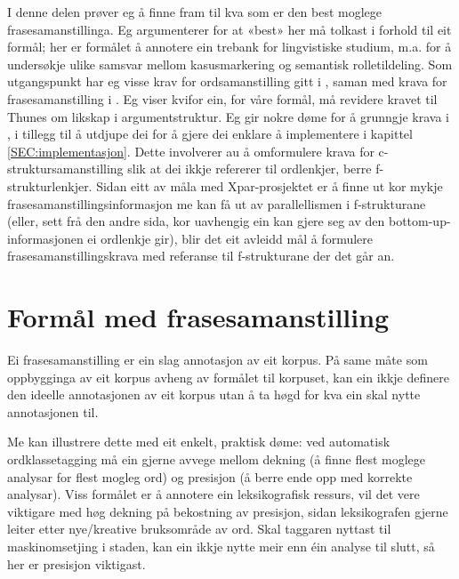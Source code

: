 \documentclass[12pt,a4paper,oneside,draft]{report}
\begin{document}
I denne delen prøver eg å finne fram til kva som er den best moglege
 frasesamanstillinga. Eg argumenterer for at «best» her må tolkast i
 forhold til eit formål; her er formålet å annotere ein trebank for
 lingvistiske studium, m.a. for å undersøkje ulike samsvar mellom
 kasusmarkering og semantisk rolletildeling.  Som utgangspunkt har eg
 visse krav for ordsamanstilling gitt i \citet{thunes2003eal}, saman
 med krava for frasesamanstilling i \citet{dyvik2009lmp}. Eg viser
 kvifor ein, for våre formål, må revidere kravet til Thunes om likskap
 i argumentstruktur. Eg gir nokre døme for å grunngje krava i
 \citet{dyvik2009lmp}, i tillegg til å utdjupe dei for å gjere dei
 enklare å implementere i kapittel \ref{SEC:implementasjon}. Dette
 involverer au å omformulere krava for c\hyp{}struktursamanstilling slik at
 dei ikkje refererer til ordlenkjer, berre f\hyp{}strukturlenkjer. Sidan
 eitt av måla med Xpar-prosjektet er å finne ut kor mykje
 frasesamanstillingsinformasjon me kan få ut av parallellismen i
 f\hyp{}strukturane (eller, sett frå den andre sida, kor uavhengig ein kan
 gjere seg av den bottom-up-informasjonen ei ordlenkje gir), blir det
 eit avleidd mål å formulere frasesamanstillingskrava med referanse
 til f\hyp{}strukturane der det går an.

\section{Formål med frasesamanstilling}
\label{sec-3.2}

\label{SEC:formaal}

Ei frasesamanstilling er ein slag annotasjon av eit korpus. På same
 måte som oppbygginga av eit korpus avheng av formålet til korpuset,
 kan ein ikkje definere den ideelle annotasjonen av eit korpus utan å
 ta høgd for kva ein skal nytte annotasjonen til.

Me kan illustrere dette med eit enkelt, praktisk døme: ved automatisk
 ordklassetagging må ein gjerne avvege mellom dekning (å finne flest
 moglege analysar for flest mogleg ord) og presisjon (å berre ende opp
 med korrekte analysar).  Viss formålet er å annotere ein
 leksikografisk ressurs, vil det vere viktigare med høg dekning på
 bekostning av presisjon, sidan leksikografen gjerne leiter etter
 nye/kreative bruksområde av ord. Skal taggaren nyttast til
 maskinomsetjing i staden, kan ein ikkje nytte meir enn éin analyse
 til slutt, så her er presisjon viktigast.
\end{document}
